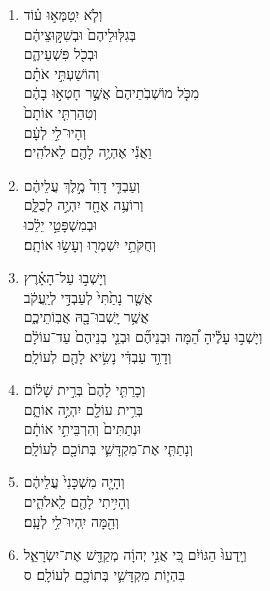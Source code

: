 \documentclass[12pt,a4paper,titlepage]{article}
\def \pscolor{red} %
\def \pslabelsep{0.3em} %
\def \psleftmargin{1em} %
\begin{document}
\begin{hebrew}
\begin{enumerate}[leftmargin=\psleftmargin, labelsep=\pslabelsep, label=\fontspec{Linux Libertine}\arabic*, font=\color{\pscolor}\small\textsuperscript, parsep=0em, itemsep=0em, topsep=0em]
    \item וְלֹ֧א יִֽטַמְּא֣וּ ע֗וֹד \\ בְּגִלּֽוּלֵיהֶם֙ וּבְשִׁקּ֣וּצֵיהֶ֔ם \\ וּבְכֹ֖ל פִּשְׁעֵיהֶ֑ם \\ וְהוֹשַׁעְתִּ֣י אֹתָ֗ם \\ מִכֹּ֤ל מוֹשְׁבֹֽתֵיהֶם֙ אֲשֶׁ֣ר חָטְא֣וּ בָהֶ֔ם \\ וְטִהַרְתִּ֤י אוֹתָם֙ \\ וְהָיוּ־לִ֣י לְעָ֔ם \\ וַאֲנִ֕י אֶהְיֶ֥ה לָהֶ֖ם לֵאלֹהִֽים׃
    \item וְעַבְדִּ֤י דָוִד֙ מֶ֣לֶךְ עֲלֵיהֶ֔ם \\ וְרוֹעֶ֥ה אֶחָ֖ד יִהְיֶ֣ה לְכֻלָּ֑ם \\ וּבְמִשְׁפָּטַ֣י יֵלֵ֔כוּ \\ וְחֻקֹּתַ֥י יִשְׁמְר֖וּ וְעָשׂ֥וּ אוֹתָֽם׃
    \item וְיָשְׁב֣וּ עַל־הָאָ֗רֶץ \\ אֲשֶׁ֤ר נָתַ֙תִּי֙ לְעַבְדִּ֣י לְיַֽעֲקֹ֔ב \\ אֲשֶׁ֥ר יָֽשְׁבוּ־בָ֖הּ אֲבֽוֹתֵיכֶ֑ם \\ וְיָשְׁב֣וּ עָלֶ֡יהָ הֵ֠מָּה וּבְנֵיהֶ֞ם וּבְנֵ֤י בְנֵיהֶם֙ עַד־עוֹלָ֔ם \\ וְדָוִ֣ד עַבְדִּ֔י נָשִׂ֥יא לָהֶ֖ם לְעוֹלָֽם׃
    \item וְכָרַתִּ֤י לָהֶם֙ בְּרִ֣ית שָׁל֔וֹם \\ בְּרִ֥ית עוֹלָ֖ם יִהְיֶ֣ה אוֹתָ֑ם \\ וּנְתַתִּים֙ וְהִרְבֵּיתִ֣י אוֹתָ֔ם \\ וְנָתַתִּ֧י אֶת־מִקְדָּשִׁ֛י בְּתוֹכָ֖ם לְעוֹלָֽם׃
    \item וְהָיָ֤ה מִשְׁכָּנִי֙ עֲלֵיהֶ֔ם \\ וְהָיִ֥יתִי לָהֶ֖ם לֵֽאלֹהִ֑ים \\ וְהֵ֖מָּה יִֽהְיוּ־לִ֥י לְעָֽם׃
    \item וְיָֽדְעוּ֙ הַגּוֹיִ֔ם כִּ֚י אֲנִ֣י יְהוָ֔ה מְקַדֵּ֖שׁ אֶת־יִשְׂרָאֵ֑ל \\ בִּהְי֧וֹת מִקְדָּשִׁ֛י בְּתוֹכָ֖ם לְעוֹלָֽם׃ ס
  \end{enumerate}
\end{hebrew}
\end{document}
